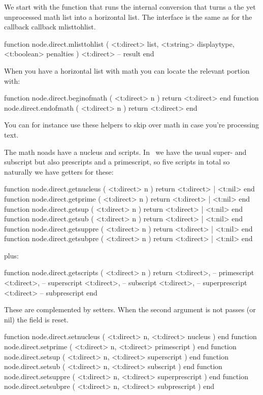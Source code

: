 We start with the function that runs the internal 
conversion that turns a the yet unprocessed math list into a horizontal list. The
interface is the same as for the callback callback {mlisttohlist}.

\starttyping[option=LUA]
function node.direct.mlisttohlist (
    <t:direct>  list,
    <t:string>  displaytype,
    <t:boolean> penalties
)
   <t:direct> -- result
end
\stoptyping

When you have a horizontal list with math you can locate the relevant portion
with:

\starttyping[option=LUA]
function node.direct.beginofmath ( <t:direct> n ) return <t:direct> end
function node.direct.endofmath   ( <t:direct> n ) return <t:direct> end
\stoptyping

You can for instance use these helpers to skip over math in case you're
processing text.

The math noads have a nucleus and scripts. In \LUAMETATEX\ we have the usual
super- and subscript but also prescripts and a primescript, so five scripts in
total so naturally we have getters for these:

\starttyping[option=LUA]
function node.direct.getnucleus ( <t:direct> n ) return <t:direct> | <t:nil> end
function node.direct.getprime   ( <t:direct> n ) return <t:direct> | <t:nil> end
function node.direct.getsup     ( <t:direct> n ) return <t:direct> | <t:nil> end
function node.direct.getsub     ( <t:direct> n ) return <t:direct> | <t:nil> end
function node.direct.getsuppre  ( <t:direct> n ) return <t:direct> | <t:nil> end
function node.direct.getsubpre  ( <t:direct> n ) return <t:direct> | <t:nil> end
\stoptyping

plus:

\starttyping[option=LUA]
function node.direct.getscripts ( <t:direct> n )
    return
        <t:direct>, -- primescript
        <t:direct>, -- superscript
        <t:direct>, -- subscript
        <t:direct>, -- superprescript
        <t:direct>  -- subprescript
end
\stoptyping

These are complemented by setters. When the second argument is not passes (or nil)
the field is reset.

\starttyping[option=LUA]
function node.direct.setnucleus ( <t:direct> n, <t:direct> nucleus        ) end
function node.direct.setprime   ( <t:direct> n, <t:direct> primescript    ) end
function node.direct.setsup     ( <t:direct> n, <t:direct> superscript    ) end
function node.direct.setsub     ( <t:direct> n, <t:direct> subscript      ) end
function node.direct.setsuppre  ( <t:direct> n, <t:direct> superprescript ) end
function node.direct.setsubpre  ( <t:direct> n, <t:direct> subprescript   ) end
\stoptyping

